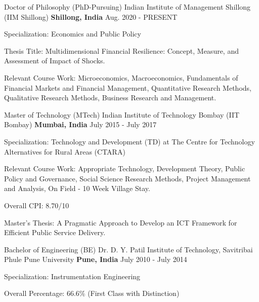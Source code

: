 
\begin{cventries}

\cventry
{Doctor of Philosophy (PhD-Pursuing)} %
{Indian Institute of Management Shillong (IIM Shillong)} %
{\textbf{Shillong, India}} %
{Aug. 2020 - PRESENT} %
{ %
\begin{cvitems}
\item {Specialization: Economics and Public Policy}
\item{Thesis Title: Multidimensional  Financial Resilience: Concept, Measure, and Assessment of Impact of Shocks.}
\item {Relevant Course Work: Microeconomics, Macroeconomics, Fundamentals of Financial Markets and Financial Management, Quantitative Research Methods, Qualitative Research Methods, Business Research and Management.}
\end{cvitems}
}
\end{cventries}
\cventry
{Master of Technology (MTech)} %
{Indian Institute of Technology Bombay (IIT Bombay)} %
{\textbf{Mumbai, India}} %
{July 2015 - July 2017} %
{ %
\begin{cvitems}
\item {Specialization: Technology and Development (TD) at The Centre for Technology Alternatives for Rural Areas (CTARA)}
\item {Relevant Course Work: Appropriate Technology, Development Theory, Public Policy and Governance, Social Science Research Methods, Project Management and Analysis, On Field - 10 Week Village Stay.}
\item {Overall CPI: 8.70/10} 
\item{Master's Thesis: A Pragmatic Approach to Develop an ICT Framework for Efficient Public Service Delivery.}
\end{cvitems}
}
\cventry
{Bachelor of Engineering (BE)} %
{Dr. D. Y. Patil Institute of Technology, Savitribai Phule Pune University} %
{\textbf{Pune, India}} %
{July 2010 - July 2014} %
{ %
\begin{cvitems}
\item {Specialization: Instrumentation Engineering}
\item {Overall Percentage: 66.6\% (First Class with Distinction)}
\
\end{cvitems}
}
